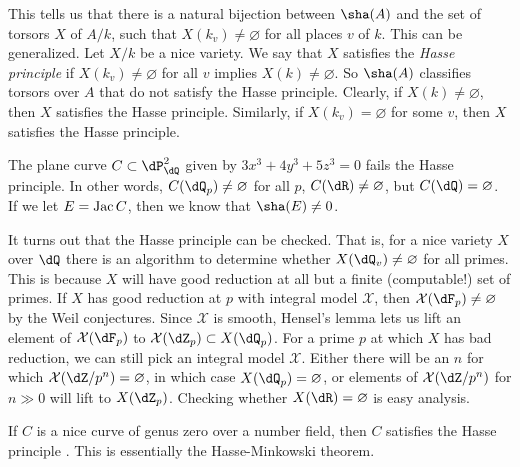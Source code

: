 This tells us that there is a natural bijection between $\sha(A)$ and the set 
of torsors $X$ of $A/k$, such that $X(k_v)\ne\varnothing$ for all places $v$ of 
$k$. This can be generalized. Let $X/k$ be a nice variety. We say that $X$ 
satisfies the \emph{Hasse principle} if $X(k_v)\ne\varnothing$ for all $v$ 
implies $X(k)\ne\varnothing$. So $\sha(A)$ classifies torsors over $A$ that 
do not satisfy the Hasse principle. Clearly, if $X(k)\ne\varnothing$, then 
$X$ satisfies the Hasse principle. Similarly, if $X(k_v)=\varnothing$ for some 
$v$, then $X$ satisfies the Hasse principle. 

\begin{example}[Selmer]
The plane curve $C\subset \dP_\dQ^2$ given by $3 x^3+4 y^3+5 z^3=0$ fails the 
Hasse principle. In other words, $C(\dQ_p)\ne \varnothing$ for all $p$, 
$C(\dR)\ne\varnothing$, but $C(\dQ)=\varnothing$. If we let $E=\operatorname{Jac} C$, then 
we know that $\sha(E)\ne 0$. 
\end{example}

It turns out that the Hasse principle can be checked. That is, for a nice 
variety $X$ over $\dQ$ there is an algorithm to determine whether 
$X(\dQ_v)\ne\varnothing$ for all primes. This is because $X$ will have good 
reduction at all but a finite (computable!) set of primes. If $X$ has good 
reduction at $p$ with integral model $\mathcal X$, then 
$\mathcal X(\dF_p)\ne\varnothing$ by the Weil conjectures. Since $\mathcal X$ 
is smooth, Hensel's lemma lets us lift an element of $\mathcal X(\dF_p)$ to 
$\mathcal X(\dZ_p)\subset X(\dQ_p)$. For a prime $p$ at 
which $X$ has bad reduction, we can still pick an integral model $\mathcal X$. 
Either there will be an $n$ for which $\mathcal X(\dZ/p^n)=\varnothing$, in 
which case $X(\dQ_p)=\varnothing$, or elements of $\mathcal X(\dZ/p^n)$ for 
$n\gg 0$ will lift to $X(\dZ_p)$. Checking whether $X(\dR)=\varnothing$ is easy 
analysis. 

If $C$ is a nice curve of genus zero over a number field, then $C$ satisfies 
the Hasse principle \cite[3.4]{ca67}. This is essentially the 
Hasse-Minkowski theorem. 

